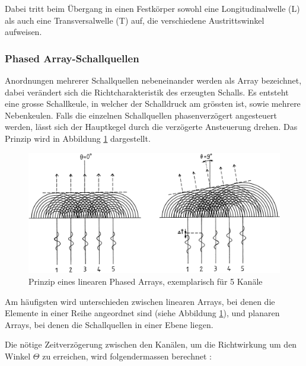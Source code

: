 Dabei tritt beim Übergang in einen Festkörper sowohl eine Longitudinalwelle (L) als auch eine Transversalwelle (T) auf, die verschiedene Austrittswinkel aufweisen.


\subsubsection{Phased Array-Schallquellen}\label{sec:phased_array_schallquellen}
Anordnungen mehrerer Schallquellen nebeneinander werden als Array bezeichnet, dabei verändert sich die Richtcharakteristik des erzeugten Schalls. Es entsteht eine grosse Schallkeule, in welcher der Schalldruck am grössten ist, sowie mehrere Nebenkeulen.
Falls die einzelnen Schallquellen phasenverzögert angesteuert werden, lässt sich der Hauptkegel durch die verzögerte Ansteuerung drehen. Das Prinzip wird in Abbildung \ref{fig:image_grundlagen_phased_array} dargestellt.

\begin{figure}[htb]
\begin{center}
\includegraphics[width=\textwidth]{graphics/image_grundlagen_phased_array.png}
\end{center}
\caption{Prinzip eines linearen Phased Arrays, exemplarisch für 5 Kanäle} %
\label{fig:image_grundlagen_phased_array}
\end{figure}
%

Am häufigsten wird unterschieden zwischen linearen Arrays, bei denen die Elemente in einer Reihe angeordnet sind (siehe Abbildung \ref{fig:image_grundlagen_phased_array}), und planaren Arrays, bei denen die Schallquellen in einer Ebene liegen.

Die nötige Zeitverzögerung zwischen den Kanälen, um die Richtwirkung um den Winkel $\Theta$ zu erreichen, wird folgendermassen berechnet \cite{WOOH}:

